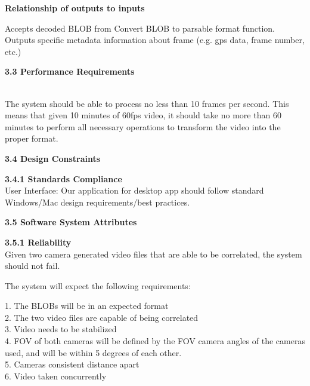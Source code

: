 \documentclass[10pt,draftclsnofoot,onecolumn]{IEEEtran}
\begin{document}
 \vspace{5mm}
\textbf{Relationship of outputs to inputs }\\
 \vspace{5mm}

Accepts decoded BLOB from Convert BLOB to parsable format function. Outputs specific metadata information about frame (e.g. gps data, frame number, etc.)
 \\\vspace{5mm}
 
 
 {\Medium\textbf{3.3 Performance Requirements}} \\
  \\\vspace{5mm}

The system should be able to process no less than 10 frames per second. This means that given 10 minutes of 60fps video, it should take no more than 60 minutes to perform all necessary operations to transform the video into the proper format.
  \\\vspace{5mm}

 {\Medium\textbf{3.4 Design Constraints}} \\
   \vspace{5mm}

 {\Medium\textbf{3.4.1 Standards Compliance}} \\
   \vspace{5mm}
   User Interface: Our application for  desktop app should follow standard Windows/Mac design requirements/best practices.
   \vspace{5mm}

 {\Medium\textbf{3.5 Software System Attributes}} \\
    \vspace{5mm}

 {\Medium\textbf{3.5.1 Reliability}} \\
Given two camera generated video files that are able to be correlated, the system should not fail.\\
 \vspace{2mm}

The system will expect the following requirements:\\
\vspace{2mm}

1. The BLOBs will be in an expected format\\
2. The two video files are capable of being correlated\\
3. Video needs to be stabilized\\
4. FOV of both cameras will be defined by the FOV camera angles of the cameras used, and will be within 5 degrees of each other. \\
5. Cameras consistent distance apart\\
6. Video taken concurrently\\
\end{document}
